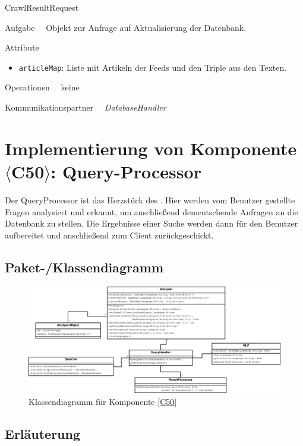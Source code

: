 \begin{class}{40}{CrawlResultRequest}
\item[Aufgabe]~\
Objekt zur Anfrage auf Aktualisierung der Datenbank.
\item[Attribute]~\
\begin{itemize}
  \item \texttt{articleMap}: Liste mit Artikeln der
  Feeds und den Triple aus den Texten.
\end{itemize}
\item[Operationen]~\
keine
\item[Kommunikationspartner]~\
\textit{DatabaseHandler}
\end{class}

\FloatBarrier

\section{Implementierung von Komponente $\langle$C50$\rangle$: Query-Processor}

Der QueryProcessor ist das Herzstück des \NewsGenies. Hier werden vom Benutzer
gestellte Fragen analysiert und erkannt, um anschließend dementschende Anfragen
an die Datenbank zu stellen. Die Ergebnisse
einer Suche werden dann für den Benutzer aufbereitet
und anschließend zum Client zurückgeschickt.

\subsection{Paket-/Klassendiagramm}

\begin{figure}[ht]
\centering
\includegraphics[width=1\textheight, angle=90]{Systementwurf/05_implementierungsentwurf/Diagramm1}
\caption{Klassendiagramm für Komponente \ref{C50}}
\end{figure}
 
\FloatBarrier

\subsection{Erläuterung}

